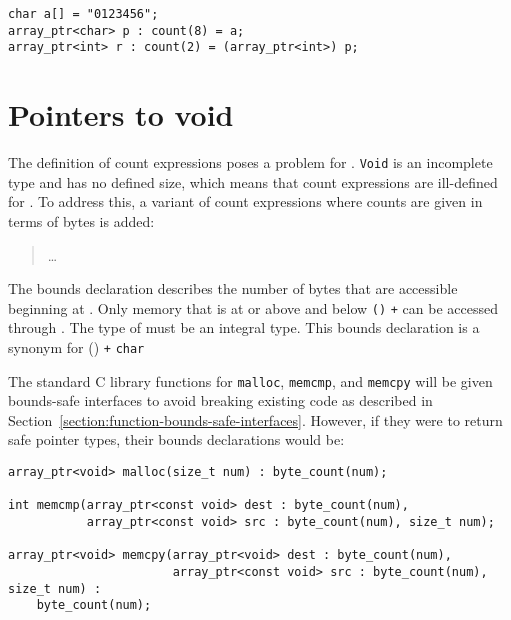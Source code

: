 \begin{verbatim}
char a[] = "0123456";
array_ptr<char> p : count(8) = a;
array_ptr<int> r : count(2) = (array_ptr<int>) p;
\end{verbatim}

\section{Pointers to void}
\label{section:pointers-to-void}

The definition of count expressions poses a problem for
\arrayptrvoid. \texttt{Void} is an
incomplete type and has no defined size, which means that count
expressions are ill-defined for
\arrayptrvoid. To address this, a
variant of count expressions where counts are given in terms of bytes is
added:


\begin{quote}
\ldots{}

\end{quote}

The bounds declaration 
describes the number of bytes that are accessible beginning at . 
Only memory that is at or above  and below \texttt{(\arrayptrchar)}
 \texttt{+}  can be accessed through . The type
of  must be an integral type. This bounds declaration is a synonym for 
           {
                      {(\arrayptrchar)  \texttt{+} }
                      {\texttt{char}}}

The standard C library functions for \texttt{malloc}, \texttt{memcmp}, and
\texttt{memcpy} will be
given bounds-safe interfaces to avoid breaking existing code as
described in Section~\ref{section:function-bounds-safe-interfaces}. 
However, if they were to return safe pointer
types, their bounds declarations would be:

\begin{verbatim}
array_ptr<void> malloc(size_t num) : byte_count(num);

int memcmp(array_ptr<const void> dest : byte_count(num),
           array_ptr<const void> src : byte_count(num), size_t num);

array_ptr<void> memcpy(array_ptr<void> dest : byte_count(num),
                       array_ptr<const void> src : byte_count(num), size_t num) :
    byte_count(num);
\end{verbatim}

